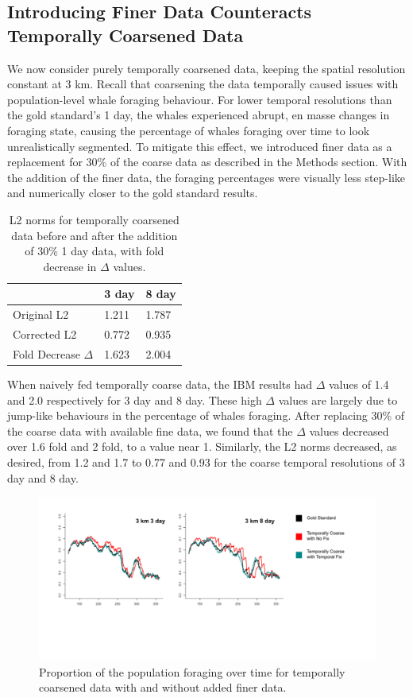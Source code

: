 \documentclass[11pt]{article}
\begin{document}
\subsection{Introducing Finer Data Counteracts Temporally Coarsened Data}
We now consider purely temporally coarsened data, keeping the spatial resolution constant at 3 km. Recall that coarsening the data temporally caused issues with population-level whale foraging behaviour. For lower temporal resolutions than the gold standard’s 1 day, the whales experienced abrupt, en masse changes in foraging state, causing the percentage of whales foraging over time to look unrealistically segmented. To mitigate this effect, we introduced finer data as a replacement for 30\% of the coarse data as described in the Methods section. With the addition of the finer data, the foraging percentages were visually less step-like and numerically closer to the gold standard results. \par

\begin{table}[ht]
    \centering
    \begin{tabular}{lll}
    \toprule
    &3 day &8 day\\ \hline
    Original L2& 1.211&1.787\\
    Corrected L2& 0.772&0.935\\
    Fold Decrease $\Delta$& 1.623&2.004\\
    \bottomrule
    \end{tabular}
    \caption{L2 norms for temporally coarsened data before and after the addition of 30\% 1 day data, with fold decrease in $\Delta$ values.}
\end{table}

When naively fed temporally coarse data, the IBM results had $\Delta$ values of 1.4 and 2.0 respectively for 3 day and 8 day. These high $\Delta$ values are largely due to jump-like behaviours in the percentage of whales foraging. After replacing 30\% of the coarse data with available fine data, we found that the $\Delta$ values decreased over 1.6 fold and 2 fold, to a value near 1. Similarly, the L2 norms decreased, as desired, from 1.2 and 1.7 to 0.77 and 0.93 for the coarse temporal resolutions of 3 day and 8 day. \par 

\begin{figure}[ht] \centering
    \includegraphics[width=6in]{temporal_fix.png}
    \caption{Proportion of the population foraging over time for temporally coarsened data with and without added finer data.}
\end{figure}
\end{document}
